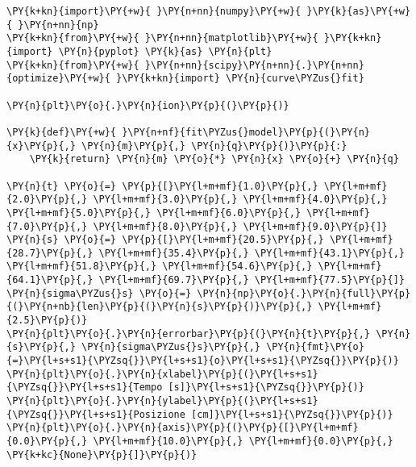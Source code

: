 \begin{Verbatim}[label=\makebox{\href{https://github.com/unipi-physics-labs/statnotes/tree/main/snippy/fit_linear.py}{https://github.com/.../fit\_linear.py}},commandchars=\\\{\}]
\PY{k+kn}{import}\PY{+w}{ }\PY{n+nn}{numpy}\PY{+w}{ }\PY{k}{as}\PY{+w}{ }\PY{n+nn}{np}
\PY{k+kn}{from}\PY{+w}{ }\PY{n+nn}{matplotlib}\PY{+w}{ }\PY{k+kn}{import} \PY{n}{pyplot} \PY{k}{as} \PY{n}{plt}
\PY{k+kn}{from}\PY{+w}{ }\PY{n+nn}{scipy}\PY{n+nn}{.}\PY{n+nn}{optimize}\PY{+w}{ }\PY{k+kn}{import} \PY{n}{curve\PYZus{}fit}

\PY{n}{plt}\PY{o}{.}\PY{n}{ion}\PY{p}{(}\PY{p}{)}

\PY{k}{def}\PY{+w}{ }\PY{n+nf}{fit\PYZus{}model}\PY{p}{(}\PY{n}{x}\PY{p}{,} \PY{n}{m}\PY{p}{,} \PY{n}{q}\PY{p}{)}\PY{p}{:}
    \PY{k}{return} \PY{n}{m} \PY{o}{*} \PY{n}{x} \PY{o}{+} \PY{n}{q}

\PY{n}{t} \PY{o}{=} \PY{p}{[}\PY{l+m+mf}{1.0}\PY{p}{,} \PY{l+m+mf}{2.0}\PY{p}{,} \PY{l+m+mf}{3.0}\PY{p}{,} \PY{l+m+mf}{4.0}\PY{p}{,} \PY{l+m+mf}{5.0}\PY{p}{,} \PY{l+m+mf}{6.0}\PY{p}{,} \PY{l+m+mf}{7.0}\PY{p}{,} \PY{l+m+mf}{8.0}\PY{p}{,} \PY{l+m+mf}{9.0}\PY{p}{]}
\PY{n}{s} \PY{o}{=} \PY{p}{[}\PY{l+m+mf}{20.5}\PY{p}{,} \PY{l+m+mf}{28.7}\PY{p}{,} \PY{l+m+mf}{35.4}\PY{p}{,} \PY{l+m+mf}{43.1}\PY{p}{,} \PY{l+m+mf}{51.8}\PY{p}{,} \PY{l+m+mf}{54.6}\PY{p}{,} \PY{l+m+mf}{64.1}\PY{p}{,} \PY{l+m+mf}{69.7}\PY{p}{,} \PY{l+m+mf}{77.5}\PY{p}{]}
\PY{n}{sigma\PYZus{}s} \PY{o}{=} \PY{n}{np}\PY{o}{.}\PY{n}{full}\PY{p}{(}\PY{n+nb}{len}\PY{p}{(}\PY{n}{s}\PY{p}{)}\PY{p}{,} \PY{l+m+mf}{2.5}\PY{p}{)}
\PY{n}{plt}\PY{o}{.}\PY{n}{errorbar}\PY{p}{(}\PY{n}{t}\PY{p}{,} \PY{n}{s}\PY{p}{,} \PY{n}{sigma\PYZus{}s}\PY{p}{,} \PY{n}{fmt}\PY{o}{=}\PY{l+s+s1}{\PYZsq{}}\PY{l+s+s1}{o}\PY{l+s+s1}{\PYZsq{}}\PY{p}{)}
\PY{n}{plt}\PY{o}{.}\PY{n}{xlabel}\PY{p}{(}\PY{l+s+s1}{\PYZsq{}}\PY{l+s+s1}{Tempo [s]}\PY{l+s+s1}{\PYZsq{}}\PY{p}{)}
\PY{n}{plt}\PY{o}{.}\PY{n}{ylabel}\PY{p}{(}\PY{l+s+s1}{\PYZsq{}}\PY{l+s+s1}{Posizione [cm]}\PY{l+s+s1}{\PYZsq{}}\PY{p}{)}
\PY{n}{plt}\PY{o}{.}\PY{n}{axis}\PY{p}{(}\PY{p}{[}\PY{l+m+mf}{0.0}\PY{p}{,} \PY{l+m+mf}{10.0}\PY{p}{,} \PY{l+m+mf}{0.0}\PY{p}{,} \PY{k+kc}{None}\PY{p}{]}\PY{p}{)}


\end{Verbatim}
